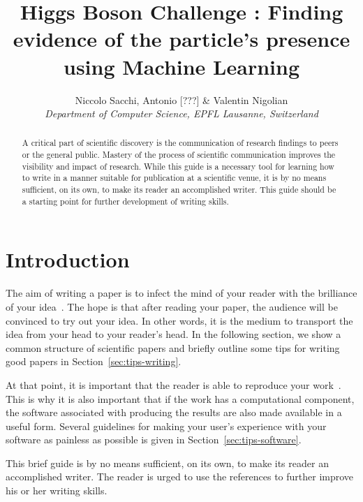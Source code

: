 \documentclass[10pt,conference,compsocconf]{IEEEtran}
\begin{document}
\title{Higgs Boson Challenge : Finding evidence of the particle's presence using Machine Learning}

\author{
  Niccolo Sacchi, Antonio [???] & Valentin Nigolian\\
  \textit{Department of Computer Science, EPFL Lausanne, Switzerland}
}

\maketitle

\begin{abstract}
  A critical part of scientific discovery is the
  communication of research findings to peers or the general public.
  Mastery of the process of scientific communication improves the
  visibility and impact of research. While this guide is a necessary
  tool for learning how to write in a manner suitable for publication
  at a scientific venue, it is by no means sufficient, on its own, to
  make its reader an accomplished writer. 
  This guide should be a starting point for further development of 
  writing skills.
\end{abstract}

\section{Introduction}

The aim of writing a paper is to infect the mind of your reader with
the brilliance of your idea~\cite{jones08}. 
The hope is that after reading your
paper, the audience will be convinced to try out your idea. In other
words, it is the medium to transport the idea from your head to your
reader's head. 
In the following
section, we show a common structure of scientific papers and briefly
outline some tips for writing good papers in
Section~\ref{sec:tips-writing}.

At that
point, it is important that the reader is able to reproduce your
work~\cite{schwab00,wavelab,gentleman05}. This is why it is also
important that if the work has a computational component, the software
associated with producing the results are also made available in a
useful form. Several guidelines for making your user's experience with
your software as painless as possible is given in
Section~\ref{sec:tips-software}.

This brief guide is by no means sufficient, on its own, to
make its reader an accomplished writer. The reader is urged to use the
references to further improve his or her writing skills.
\end{document}
